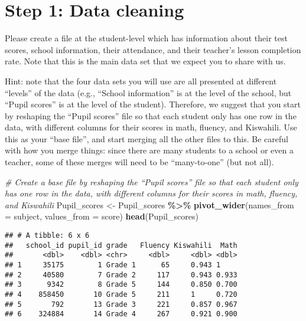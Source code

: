 \documentclass[
]{article}
\newenvironment{Shaded}{\begin{snugshade}}{\end{snugshade}}
\newcommand{\AttributeTok}[1]{\textcolor[rgb]{0.13,0.29,0.53}{#1}}
\newcommand{\CommentTok}[1]{\textcolor[rgb]{0.56,0.35,0.01}{\textit{#1}}}
\newcommand{\FunctionTok}[1]{\textcolor[rgb]{0.13,0.29,0.53}{\textbf{#1}}}
\newcommand{\NormalTok}[1]{#1}
\newcommand{\OtherTok}[1]{\textcolor[rgb]{0.56,0.35,0.01}{#1}}
\newcommand{\SpecialCharTok}[1]{\textcolor[rgb]{0.81,0.36,0.00}{\textbf{#1}}}
\begin{document}
\hypertarget{step-1-data-cleaning}{%
\section{Step 1: Data cleaning}\label{step-1-data-cleaning}}

Please create a file at the student-level which has information about
their test scores, school information, their attendance, and their
teacher's lesson completion rate. Note that this is the main data set
that we expect you to share with us.

Hint: note that the four data sets you will use are all presented at
different ``levels'' of the data (e.g., ``School information'' is at the
level of the school, but ``Pupil scores'' is at the level of the
student). Therefore, we suggest that you start by reshaping the ``Pupil
scores'' file so that each student only has one row in the data, with
different columns for their scores in math, fluency, and Kiswahili. Use
this as your ``base file'', and start merging all the other files to
this. Be careful with how you merge things: since there are many
students to a school or even a teacher, some of these merges will need
to be ``many-to-one'' (but not all).

\begin{Shaded}
\begin{Highlighting}[]
\CommentTok{\# Create a base file by reshaping the “Pupil scores” file so that each student only has one row in the data, with different columns for their scores in math, fluency, and Kiswahili}
\NormalTok{Pupil\_scores }\OtherTok{\textless{}{-}}\NormalTok{ Pupil\_scores }\SpecialCharTok{\%\textgreater{}\%}
  \FunctionTok{pivot\_wider}\NormalTok{(}\AttributeTok{names\_from =}\NormalTok{ subject, }\AttributeTok{values\_from =}\NormalTok{ score)}
\FunctionTok{head}\NormalTok{(Pupil\_scores)}
\end{Highlighting}
\end{Shaded}

\begin{verbatim}
## # A tibble: 6 x 6
##   school_id pupil_id grade   Fluency Kiswahili  Math
##       <dbl>    <dbl> <chr>     <dbl>     <dbl> <dbl>
## 1     35175        1 Grade 1      65     0.943 1    
## 2     40580        7 Grade 2     117     0.943 0.933
## 3      9342        8 Grade 5     144     0.850 0.700
## 4    858450       10 Grade 5     211     1     0.720
## 5       792       13 Grade 3     221     0.857 0.967
## 6    324884       14 Grade 4     267     0.921 0.900
\end{verbatim}
\end{document}
